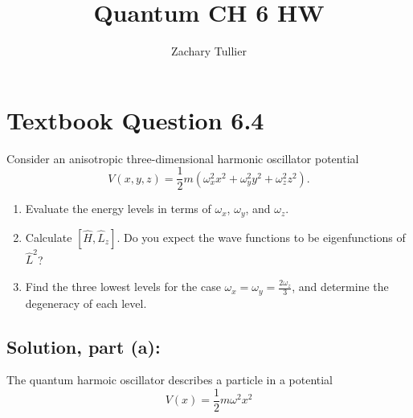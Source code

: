 \documentclass[12pt]{article}
\begin{document}
\singlespacing  %
\title{Quantum CH 6 HW}

\author[1]{Zachary Tullier}
\date{}
\maketitle

\section{Textbook Question 6.4}
    Consider an anisotropic three-dimensional harmonic oscillator potential
    \[
        V(x, y, z) = \frac{1}{2} m \left( \omega_x^2 x^2 + \omega_y^2 y^2 + \omega_z^2 z^2 \right).
    \]
    
    \begin{enumerate}
        \item[(a)] Evaluate the energy levels in terms of \( \omega_x \), \( \omega_y \), and \( \omega_z \).
        \item[(b)] Calculate \( [\hat{H}, \hat{L}_z] \). Do you expect the wave functions to be eigenfunctions of \( \hat{L}^2 \)?
        \item[(c)] Find the three lowest levels for the case \( \omega_x = \omega_y = \frac{2\omega_z}{3} \), and determine the degeneracy of each level.
    \end{enumerate}

    \subsection{Solution, part (a):}
        The quantum harmoic oscillator describes a particle in a potential
        \begin{equation} \label{eq: V}
            V(x) = \frac{1}{2} m \omega^2 x^2
        \end{equation}
\end{document}
